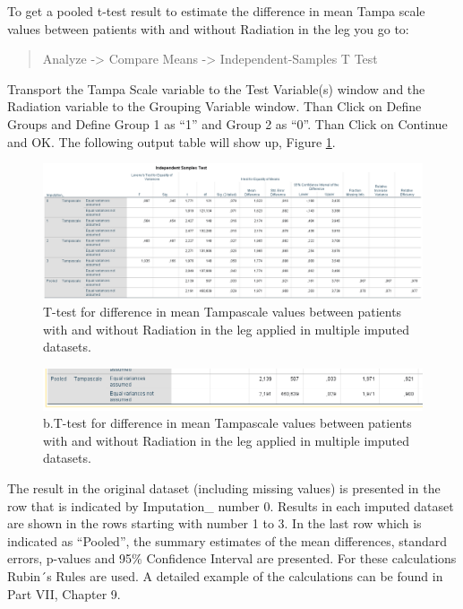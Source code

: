 \documentclass[]{book}
\begin{document}
To get a pooled t-test result to estimate the difference in mean Tampa
scale values between patients with and without Radiation in the leg you
go to:

\begin{quote}
Analyze -\textgreater{} Compare Means -\textgreater{}
Independent-Samples T Test
\end{quote}

Transport the Tampa Scale variable to the Test Variable(s) window and
the Radiation variable to the Grouping Variable window. Than Click on
Define Groups and Define Group 1 as ``1'' and Group 2 as ``0''. Than
Click on Continue and OK. The following output table will show up,
Figure \ref{fig:tab5-1a}.

\begin{figure}

{\centering \includegraphics[width=0.9\linewidth]{images/table5.1} 

}

\caption{T-test for difference in mean Tampascale values between patients with and without Radiation in the leg applied in multiple imputed datasets.}\label{fig:tab5-1a}
\end{figure}

\begin{figure}

{\centering \includegraphics[width=0.9\linewidth]{images/table5.1b} 

}

\caption{b.T-test for difference in mean Tampascale values between patients with and without Radiation in the leg applied in multiple imputed datasets.}\label{fig:tab5-1b}
\end{figure}

The result in the original dataset (including missing values) is
presented in the row that is indicated by Imputation\_ number 0. Results
in each imputed dataset are shown in the rows starting with number 1 to
3. In the last row which is indicated as ``Pooled'', the summary
estimates of the mean differences, standard errors, p-values and 95\%
Confidence Interval are presented. For these calculations Rubin´s Rules
are used. A detailed example of the calculations can be found in Part
VII, Chapter 9.
\end{document}
